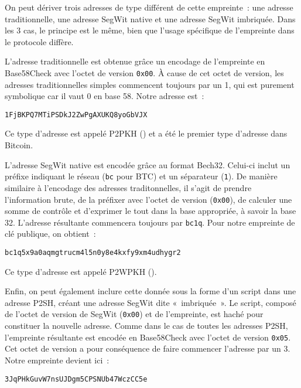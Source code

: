 On peut dériver trois adresses de type différent de cette empreinte~: une adresse traditionnelle, une adresse SegWit native et une adresse SegWit imbriquée. Dans les 3 cas, le principe est le même, bien que l'usage spécifique de l'empreinte dans le protocole diffère.

L'adresse traditionnelle est obtenue grâce un encodage de l'empreinte en Base58Check avec l'octet de version \texttt{0x00}. À cause de cet octet de version, les adresses traditionnelles simples commencent toujours par un 1, qui est purement symbolique car il vaut 0 en base 58. Notre adresse est~:

\begin{Verbatim}[fontsize=\footnotesize]
1FjBKPQ7MTiPSDkJ2ZwPgAXUKQ8yoGbVJX
\end{Verbatim}

Ce type d'adresse est appelé P2PKH () et a été le premier type d'adresse dans Bitcoin.

L'adresse SegWit native est encodée grâce au format Bech32. Celui-ci inclut un préfixe indiquant le réseau (\texttt{bc} pour BTC) et un séparateur (\texttt{1}). De manière similaire à l'encodage des adresses traditonnelles, il s'agit de prendre l'information brute, de la préfixer avec l'octet de version (\texttt{0x00}), de calculer une somme de contrôle et d'exprimer le tout dans la base appropriée, à savoir la base 32. L'adresse résultante commencera toujours par \texttt{bc1q}. Pour notre empreinte de clé publique, on obtient~:

\begin{Verbatim}[fontsize=\footnotesize]
bc1q5x9a0aqmgtrucm4l5n0y8e4kxfy9xm4udhygr2
\end{Verbatim}

Ce type d'adresse est appelé P2WPKH ().

Enfin, on peut également inclure cette donnée sous la forme d'un script dans une adresse P2SH, créant une adresse SegWit dite «~imbriquée~». Le script, composé de l'octet de version de SegWit (\texttt{0x00}) et de l'empreinte, est haché pour constituer la nouvelle adresse. Comme dans le cas de toutes les adresses P2SH, l'empreinte résultante est encodée en Base58Check avec l'octet de version \texttt{0x05}. Cet octet de version a pour conséquence de faire commencer l'adresse par un 3. Notre empreinte devient ici~:

\begin{Verbatim}[fontsize=\footnotesize]
3JqPHkGuvW7nsUJDgm5CPSNUb47WczCC5e
\end{Verbatim}

